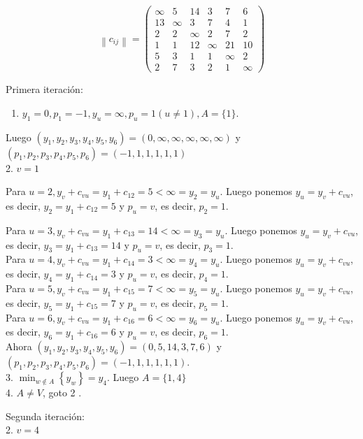 \documentclass[10pt]{article}
\begin{document}
$$
\left\|c_{i j}\right\|=\left(\begin{array}{cccccc}
\infty & 5 & 14 & 3 & 7 & 6 \\
13 & \infty & 3 & 7 & 4 & 1 \\
2 & 2 & \infty & 2 & 7 & 2 \\
1 & 1 & 12 & \infty & 21 & 10 \\
5 & 3 & 1 & 1 & \infty & 2 \\
2 & 7 & 3 & 2 & 1 & \infty
\end{array}\right)
$$

Primera iteración:

\begin{enumerate}
  \item $y_{1}=0, p_{1}=-1, y_{u}=\infty, p_{u}=1(u \neq 1), A=\{1\}$.
\end{enumerate}

Luego $\left(y_{1}, y_{2}, y_{3}, y_{4}, y_{5}, y_{6}\right)=(0, \infty, \infty, \infty, \infty, \infty)$ y $\left(p_{1}, p_{2}, p_{3}, p_{4}, p_{5}, p_{6}\right)=(-1,1,1,1,1,1)$\\
2. $v=1$

Para $u=2, y_{v}+c_{v u}=y_{1}+c_{12}=5<\infty=y_{2}=y_{u}$. Luego ponemos $y_{u}=y_{v}+c_{v u}$, es decir, $y_{2}=y_{1}+c_{12}=5$ y $p_{u}=v$, es decir, $p_{2}=1$.

Para $u=3, y_{v}+c_{v u}=y_{1}+c_{13}=14<\infty=y_{3}=y_{u}$. Luego ponemos $y_{u}=y_{v}+c_{v u}$, es decir, $y_{3}=y_{1}+c_{13}=14$ y $p_{u}=v$, es decir, $p_{3}=1$.\\
Para $u=4, y_{v}+c_{v u}=y_{1}+c_{14}=3<\infty=y_{4}=y_{u}$. Luego ponemos $y_{u}=y_{v}+c_{v u}$, es decir, $y_{4}=y_{1}+c_{14}=3$ y $p_{u}=v$, es decir, $p_{4}=1$.\\
Para $u=5, y_{v}+c_{v u}=y_{1}+c_{15}=7<\infty=y_{5}=y_{u}$. Luego ponemos $y_{u}=y_{v}+c_{v u}$, es decir, $y_{5}=y_{1}+c_{15}=7$ y $p_{u}=v$, es decir, $p_{5}=1$.\\
Para $u=6, y_{v}+c_{v u}=y_{1}+c_{16}=6<\infty=y_{6}=y_{u}$. Luego ponemos $y_{u}=y_{v}+c_{v u}$, es decir, $y_{6}=y_{1}+c_{16}=6$ y $p_{u}=v$, es decir, $p_{6}=1$.\\
Ahora $\left(y_{1}, y_{2}, y_{3}, y_{4}, y_{5}, y_{6}\right)=(0,5,14,3,7,6)$ y $\left(p_{1}, p_{2}, p_{3}, p_{4}, p_{5}, p_{6}\right)=(-1,1,1,1,1,1)$.\\
3. $\min _{w \notin A}\left\{y_{w}\right\}=y_{4}$. Luego $A=\{1,4\}$\\
4. $A \neq V$, goto 2 .

Segunda iteración:\\
2. $v=4$
\end{document}
